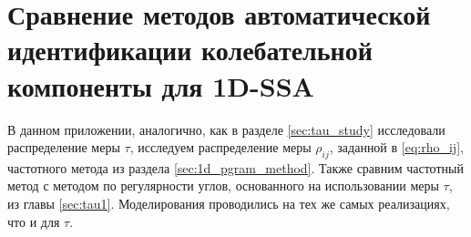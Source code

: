 \documentclass[specialist,
               substylefile = spbu.rtx,
               subf,href,colorlinks=true, 12pt]{disser}
\begin{document}




\appendix
\chapter{Сравнение методов автоматической идентификации колебательной компоненты для 1D-SSA}
\label{sec:compare}
В данном приложении, аналогично, как в разделе \ref{sec:tau_study} исследовали распределение меры $\tau$, исследуем распределение меры $\rho_{ij}$, заданной в \eqref{eq:rho_ij}, частотного метода из раздела \ref{sec:1d_pgram_method}. Также сравним частотный метод с методом по регулярности углов, основанного на использовании меры $\tau$, из главы \ref{sec:tau1}.
Моделирования проводились на тех же самых реализациях, что и для $\tau$.
%
\end{document}
